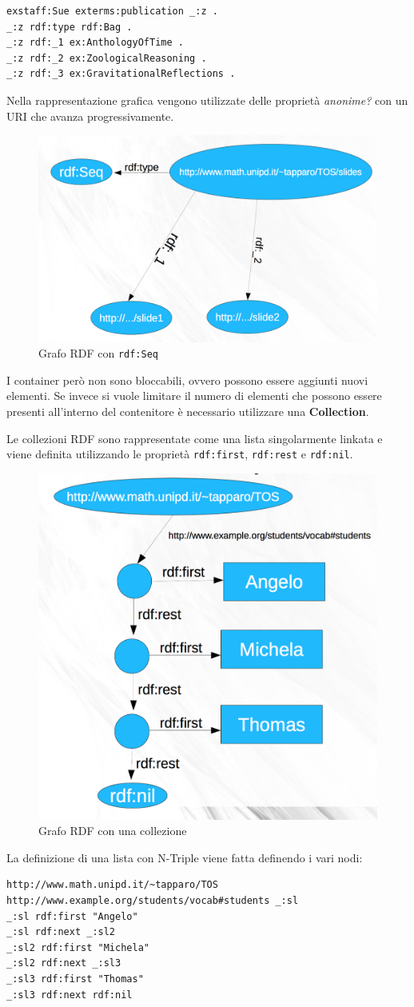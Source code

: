 \begin{lstlisting}[caption=Bag con N-Triple]
exstaff:Sue exterms:publication _:z .
_:z rdf:type rdf:Bag .
_:z rdf:_1 ex:AnthologyOfTime .
_:z rdf:_2 ex:ZoologicalReasoning .
_:z rdf:_3 ex:GravitationalReflections . 
\end{lstlisting}

Nella rappresentazione grafica vengono utilizzate delle proprietà \textit{anonime?} con un URI che avanza progressivamente.
\FloatBarrier
\begin{figure}[htbp]
	\centering
	\includegraphics[width=.4\textwidth]{./images/seq_graph.png}
	\caption{Grafo RDF con \texttt{rdf:Seq}}
\end{figure}

I container però non sono bloccabili, ovvero possono essere aggiunti nuovi elementi.
Se invece si vuole limitare il numero di elementi che possono essere presenti all'interno del contenitore è necessario utilizzare una \textbf{Collection}.

Le collezioni RDF sono rappresentate come una lista singolarmente linkata e viene definita utilizzando le proprietà \texttt{rdf:first}, \texttt{rdf:rest} e \texttt{rdf:nil}.

\begin{figure}[htbp]
	\centering
	\includegraphics[width=.4\textwidth]{./images/list_graph.png}
	\caption{Grafo RDF con una collezione}
\end{figure}

La definizione di una lista con N-Triple viene fatta definendo i vari nodi:

\begin{lstlisting}[caption=Definzione di una lista con N-Triple]
http://www.math.unipd.it/~tapparo/TOS http://www.example.org/students/vocab#students _:sl
_:sl rdf:first "Angelo"
_:sl rdf:next _:sl2
_:sl2 rdf:first "Michela"
_:sl2 rdf:next _:sl3
_:sl3 rdf:first "Thomas"
_:sl3 rdf:next rdf:nil
\end{lstlisting} 

